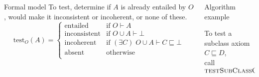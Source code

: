\documentclass[final,fleqn]{beamer}
\begin{document}
\begin{frame}{}
\begin{columns}[onlytextwidth]
\begin{column}{.45\linewidth}
\begin{minipage}[t][.65\paperheight][s]{\columnwidth}
\begin{block}{Formal model\phantom{y}}
        To test, determine if $A$ is already entailed by $O$, would make it inconsistent or incoherent, or none of these.
        \vspace{1ex}
        \[
          \mathrm{test}_O(A) =
          \begin{cases}
            \text{entailed} &
              \text{if } O \vdash A \\
            \text{inconsistent} &
              \text{if } O \cup A \vdash \bot \\
            \text{incoherent} &
              \text{if } (\exists C)\; O \cup A \vdash C \sqsubseteq \bot \\
            \text{absent} &
              \text {otherwise} \\
          \end{cases}
        \]
      \end{block}
    \end{minipage}
  \end{column}
  \begin{column}{.45\linewidth}
    \begin{minipage}[t][.65\paperheight][s]{\columnwidth}
      \begin{block}{Algorithm example}
        \begin{center}
          To test a subclass axiom $C \sqsubseteq D$, \\
          call $\textsc{testSubClassOf}(C, D)$
        \end{center}

        \vspace{1cm}
        \hspace{\dimexpr.5\linewidth-6.5cm}
\end{block}
\end{minipage}
\end{column}
\end{columns}
\end{frame}
\end{document}
